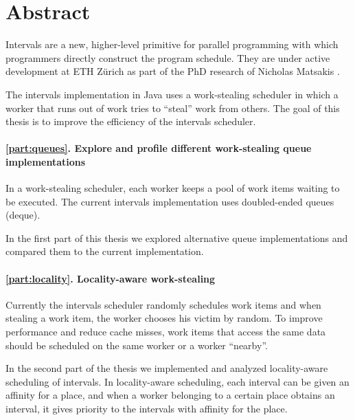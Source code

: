 
\chapter*{Abstract}
\label{chap:abstract}

Intervals are a new, higher-level primitive for parallel programming
with which programmers directly construct the program schedule. They
are under active development at ETH Zürich as part of the PhD research
of Nicholas Matsakis \cite{Matsakis2010}.

The intervals implementation in Java uses a work-stealing scheduler in
which a worker that runs out of work tries to ``steal'' work from
others. The goal of this thesis is to improve the efficiency of the
intervals scheduler.


\subsubsection*{\autoref{part:queues}. Explore and profile different
  work-stealing queue implementations}

In a work-stealing scheduler, each worker keeps a pool of work items
waiting to be executed. The current intervals implementation uses
doubled-ended queues (deque).  

In the first part of this thesis we explored alternative queue
implementations and compared them to the current implementation.

\subsubsection*{\autoref{part:locality}. Locality-aware work-stealing}

Currently the intervals scheduler randomly schedules work items and
when stealing a work item, the worker chooses his victim by random. To
improve performance and reduce cache misses, work items that access
the same data should be scheduled on the same worker or a worker
``nearby''.

In the second part of the thesis we implemented and analyzed
locality-aware scheduling of intervals. In locality-aware scheduling,
each interval can be given an affinity for a place, and when a worker
belonging to a certain place obtains an interval, it gives priority to
the intervals with affinity for the place.

